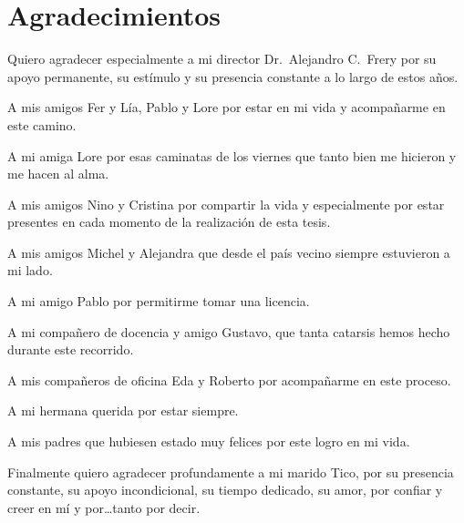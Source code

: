 
\chapter*{Agradecimientos}

Quiero agradecer especialmente a mi director Dr.\ Alejandro C.\ Frery por su apoyo permanente, su estímulo y su presencia constante a lo largo de estos años. 

A mis amigos Fer y Lía, Pablo y Lore por estar en mi vida y acompañarme en este camino.

A mi amiga Lore por esas caminatas de los viernes que tanto bien me hicieron y me hacen al alma.

A mis amigos Nino y Cristina por compartir la vida y especialmente por estar presentes en cada momento de la realización de esta tesis.

A mis amigos Michel y Alejandra que desde el país vecino siempre estuvieron a mi lado.

A mi amigo Pablo por permitirme tomar una licencia.

A mi compañero de docencia y amigo Gustavo, que tanta catarsis hemos hecho durante este recorrido.

A mis compañeros de oficina Eda y Roberto por acompañarme en este proceso. 

A mi hermana querida por estar siempre.

A mis padres que hubiesen estado muy felices por este logro en mi vida.

Finalmente quiero agradecer profundamente a mi marido Tico, por su presencia constante, su apoyo incondicional, su tiempo dedicado, su amor, por confiar y creer en mí y por\dots tanto por decir.